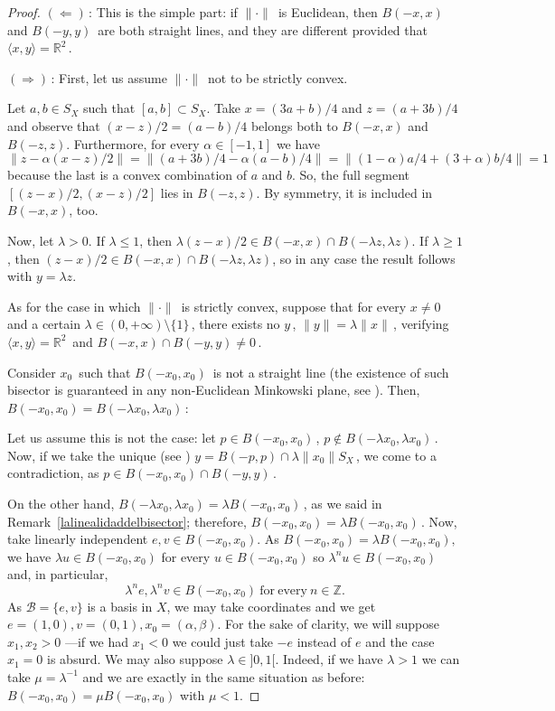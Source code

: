 \documentclass[12pt]{amsproc}
\theoremstyle{remark}
\def\equi{=}
\def\Z{\mathbb Z}
\def\B{\mathcal B}
\def\norma{\|\cdot\|}
\begin{document}
\begin{proof}

$(\Leftarrow)\,$: This is the simple part: if $\norma\,$ is Euclidean, then $B(-x,x)\,$ and $B(-y,y)\,$ are both straight lines, and they are different provided that $\langle x,y\rangle=\mathbb{R}^2\,$.

$(\Rightarrow)\,$: First, let us assume $\norma\,$ not to be strictly convex. 

Let $a, b\in S_X$ such that $[a,b]\subset S_X$. Take $x=(3a+b)/4$ and $z=(a+3b)/4$ and observe 
that $(x-z)/2=(a-b)/4$ belongs both to $B(-x,x)$ and $B(-z,z)$. Furthermore, for every $\alpha\in[-1,1]$ we have 
$$\|z-\alpha(x-z)/2\|=\|(a+3b)/4-\alpha(a-b)/4\|=\|(1-\alpha)a/4+(3+\alpha)b/4\|=1$$
because the last is a convex combination of $a$ and $b$. So, the full segment $[(z-x)/2,(x-z)/2]$ 
lies in $B(-z,z)$. By symmetry, it is included in $B(-x,x)$, too. 

Now, let $\lambda>0$. If $\lambda\leq 1$, then $\lambda(z-x)/2\in B(-x,x)\cap B(-\lambda z,\lambda z)$. 
If $\lambda\geq 1$, then $(z-x)/2\in B(-x,x)\cap B(-\lambda z,\lambda z)$, so in any case the result follows with 
$y=\lambda z$.

\medskip

As for the case in which $\norma\,$ is strictly convex, suppose that for every $x\neq 0\,$ and a certain $\lambda\in (0,+\infty)\setminus \{1\}\,$, there exists no $y\,$, $\|y\|=\lambda\|x\|\,$, verifying $\langle x,y\rangle =\mathbb{R}^2\,$ and $B(-x,x)\cap B(-y,y)\neq 0\,$.

Consider $x_0\,$ such that $B(-x_0,x_0)\,$ is not a straight line (the existence of such bisector is guaranteed in any non-Euclidean Minkowski plane, see \cite[Th. 5.5.]{alonso2012birkhoff}). Then, $B(-x_0,x_0)=B(-\lambda x_0,\lambda x_0)\,$: 

Let us assume this is not the case: let $p\in B(-x_0,x_0)\,$, $p\notin B(-\lambda x_0,\lambda x_0)\,$. Now, if we take the unique (see \cite[Cor. 2.5]{jiliwu2011}) $y=B(-p,p)\cap \lambda \|x_0\|S_{X}\,$, we come to a contradiction, as $p\in B(-x_0,x_0)\cap B(-y,y)\,$.

On the other hand, $B(-\lambda x_0,\lambda x_0)=\lambda B(-x_0,x_0)\,$, as we said in Remark~\ref{lalinealidaddelbisector}; therefore, $B(-x_0,x_0)=\lambda B(-x_0,x_0)\,$.
Now, take linearly independent $e, v\in B(-x_0,x_0)$. As $B(-x_0,x_0)=\lambda B(-x_0,x_0),$ 
we have $\lambda u\in B(-x_0,x_0)$ for every $u\in B(-x_0,x_0)$ so $\lambda^n u\in B(-x_0,x_0)$ and, 
in particular, 
\begin{equation}\label{lambdaestan}
\lambda^n e, \lambda^n v\in B(-x_0,x_0)\mathrm{\ for\ every\ } n\in\Z.
\end{equation}
As $\B=\{e,v\}$ is a basis in $X$, we may take coordinates and we get 
$e\equi(1,0), v\equi(0,1), x_0\equi(\alpha,\beta)$. For the sake of clarity, we will suppose 
$x_1,x_2>0$ ---if we had $x_1<0$ we could just take $-e$ instead of $e$ and the case 
$x_1=0$ is absurd. 
We may also suppose $\lambda\in]0,1[$. Indeed, if we have $\lambda>1$ 
we can take $\mu=\lambda^{-1}$ and we are exactly in the same situation as before: 
$B(-x_0,x_0)=\mu B(-x_0,x_0)$ with $\mu<1$. 


\end{proof}
\end{document}

